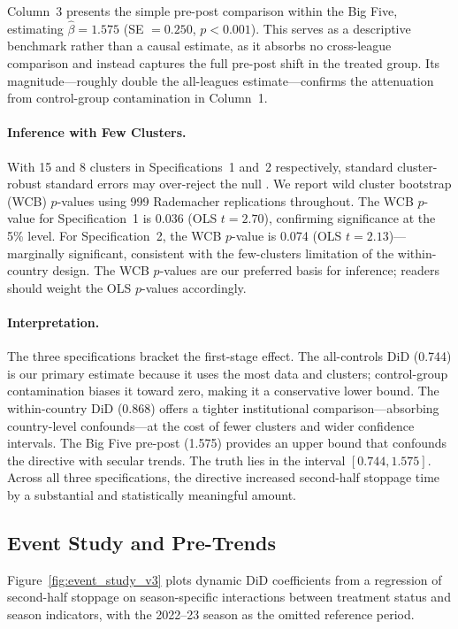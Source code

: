 \documentclass[12pt]{article}
\begin{document}
Column~3 presents the simple pre-post comparison within the Big Five, estimating $\hat{\beta} = 1.575$ (SE $= 0.250$, $p < 0.001$). This serves as a descriptive benchmark rather than a causal estimate, as it absorbs no cross-league comparison and instead captures the full pre-post shift in the treated group. Its magnitude---roughly double the all-leagues estimate---confirms the attenuation from control-group contamination in Column~1.

\paragraph{Inference with Few Clusters.} With 15 and 8 clusters in Specifications~1 and~2 respectively, standard cluster-robust standard errors may over-reject the null \citep{cameron2008bootstrap, webb2023reworking}. We report wild cluster bootstrap (WCB) $p$-values using 999 Rademacher replications throughout. The WCB $p$-value for Specification~1 is 0.036 (OLS $t = 2.70$), confirming significance at the 5\% level. For Specification~2, the WCB $p$-value is 0.074 (OLS $t = 2.13$)---marginally significant, consistent with the few-clusters limitation of the within-country design. The WCB $p$-values are our preferred basis for inference; readers should weight the OLS $p$-values accordingly.

\paragraph{Interpretation.} The three specifications bracket the first-stage effect. The all-controls DiD (0.744) is our primary estimate because it uses the most data and clusters; control-group contamination biases it toward zero, making it a conservative lower bound. The within-country DiD (0.868) offers a tighter institutional comparison---absorbing country-level confounds---at the cost of fewer clusters and wider confidence intervals. The Big Five pre-post (1.575) provides an upper bound that confounds the directive with secular trends. The truth lies in the interval $[0.744, 1.575]$. Across all three specifications, the directive increased second-half stoppage time by a substantial and statistically meaningful amount.


\subsection{Event Study and Pre-Trends}
\label{subsec:pretrends_results}

Figure~\ref{fig:event_study_v3} plots dynamic DiD coefficients from a regression of second-half stoppage on season-specific interactions between treatment status and season indicators, with the 2022--23 season as the omitted reference period.
\end{document}
